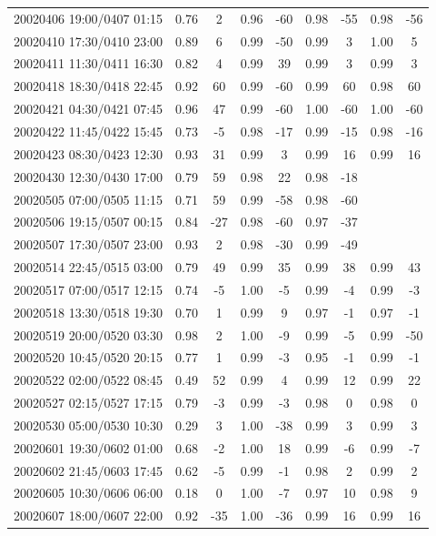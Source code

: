 \documentclass[linenumbers,draft]{agujournal}
\begin{document}
\begin{center}
\begin{longtable}{c||cc|cc|cc|cc}
20020406 19:00/0407 01:15 & 0.76 & 2 & 0.96 & -60 & 0.98 & -55 & 0.98 & -56 \\
20020410 17:30/0410 23:00 & 0.89 & 6 & 0.99 & -50 & 0.99 & 3 & 1.00 & 5 \\
20020411 11:30/0411 16:30 & 0.82 & 4 & 0.99 & 39 & 0.99 & 3 & 0.99 & 3 \\
20020418 18:30/0418 22:45 & 0.92 & 60 & 0.99 & -60 & 0.99 & 60 & 0.98 & 60 \\
20020421 04:30/0421 07:45 & 0.96 & 47 & 0.99 & -60 & 1.00 & -60 & 1.00 & -60 \\
20020422 11:45/0422 15:45 & 0.73 & -5 & 0.98 & -17 & 0.99 & -15 & 0.98 & -16 \\
20020423 08:30/0423 12:30 & 0.93 & 31 & 0.99 & 3 & 0.99 & 16 & 0.99 & 16 \\
20020430 12:30/0430 17:00 & 0.79 & 59 & 0.98 & 22 & 0.98 & -18 &  &  \\
20020505 07:00/0505 11:15 & 0.71 & 59 & 0.99 & -58 & 0.98 & -60 &  &  \\
20020506 19:15/0507 00:15 & 0.84 & -27 & 0.98 & -60 & 0.97 & -37 &  &  \\
20020507 17:30/0507 23:00 & 0.93 & 2 & 0.98 & -30 & 0.99 & -49 &  &  \\
20020514 22:45/0515 03:00 & 0.79 & 49 & 0.99 & 35 & 0.99 & 38 & 0.99 & 43 \\
20020517 07:00/0517 12:15 & 0.74 & -5 & 1.00 & -5 & 0.99 & -4 & 0.99 & -3 \\
20020518 13:30/0518 19:30 & 0.70 & 1 & 0.99 & 9 & 0.97 & -1 & 0.97 & -1 \\
20020519 20:00/0520 03:30 & 0.98 & 2 & 1.00 & -9 & 0.99 & -5 & 0.99 & -50 \\
20020520 10:45/0520 20:15 & 0.77 & 1 & 0.99 & -3 & 0.95 & -1 & 0.99 & -1 \\
20020522 02:00/0522 08:45 & 0.49 & 52 & 0.99 & 4 & 0.99 & 12 & 0.99 & 22 \\
20020527 02:15/0527 17:15 & 0.79 & -3 & 0.99 & -3 & 0.98 & 0 & 0.98 & 0 \\
20020530 05:00/0530 10:30 & 0.29 & 3 & 1.00 & -38 & 0.99 & 3 & 0.99 & 3 \\
20020601 19:30/0602 01:00 & 0.68 & -2 & 1.00 & 18 & 0.99 & -6 & 0.99 & -7 \\
20020602 21:45/0603 17:45 & 0.62 & -5 & 0.99 & -1 & 0.98 & 2 & 0.99 & 2 \\
20020605 10:30/0606 06:00 & 0.18 & 0 & 1.00 & -7 & 0.97 & 10 & 0.98 & 9 \\
20020607 18:00/0607 22:00 & 0.92 & -35 & 1.00 & -36 & 0.99 & 16 & 0.99 & 16 \\

\end{longtable}
\end{center}
\end{document}
